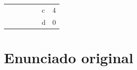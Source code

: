\documentclass[a4paper, 10pt, twoside, notitlepage]{article}
\begin{document}
\begin{table}[htp]
\begin{tabular}{cccllll}
                                           &                                        &                                        & \multicolumn{1}{l|}{} & \multicolumn{1}{l|}{}                     & \multicolumn{1}{l|}{c}                 & \multicolumn{1}{l|}{4}                 \\ \cline{6-7} 
                                           &                                        &                                        & \multicolumn{1}{l|}{} & \multicolumn{1}{l|}{}                     & \multicolumn{1}{l|}{d}                 & \multicolumn{1}{l|}{0}                 \\ \cline{5-7} 
\end{tabular}
\end{table}

\newpage
\section{Enunciado original}\label{sec:enunciado}

\end{document}
